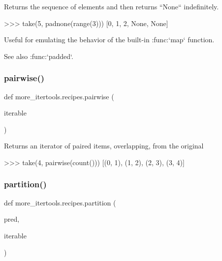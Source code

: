 \begin{DoxyVerb}Returns the sequence of elements and then returns ``None`` indefinitely.

    >>> take(5, padnone(range(3)))
    [0, 1, 2, None, None]

Useful for emulating the behavior of the built-in :func:`map` function.

See also :func:`padded`.\end{DoxyVerb}
 \mbox{\label{namespacemore__itertools_1_1recipes_a477d223bd446f8adb19e3e3c01cccb6f}} 
\subsubsection{\texorpdfstring{pairwise()}{pairwise()}}
{\footnotesize\ttfamily def more\+\_\+itertools.\+recipes.\+pairwise (\begin{DoxyParamCaption}\item[{}]{iterable }\end{DoxyParamCaption})}

\begin{DoxyVerb}Returns an iterator of paired items, overlapping, from the original

    >>> take(4, pairwise(count()))
    [(0, 1), (1, 2), (2, 3), (3, 4)]\end{DoxyVerb}
 \mbox{\label{namespacemore__itertools_1_1recipes_a260ce2b6a650dd423b430a7038d79159}} 
\subsubsection{\texorpdfstring{partition()}{partition()}}
{\footnotesize\ttfamily def more\+\_\+itertools.\+recipes.\+partition (\begin{DoxyParamCaption}\item[{}]{pred,  }\item[{}]{iterable }\end{DoxyParamCaption})}

